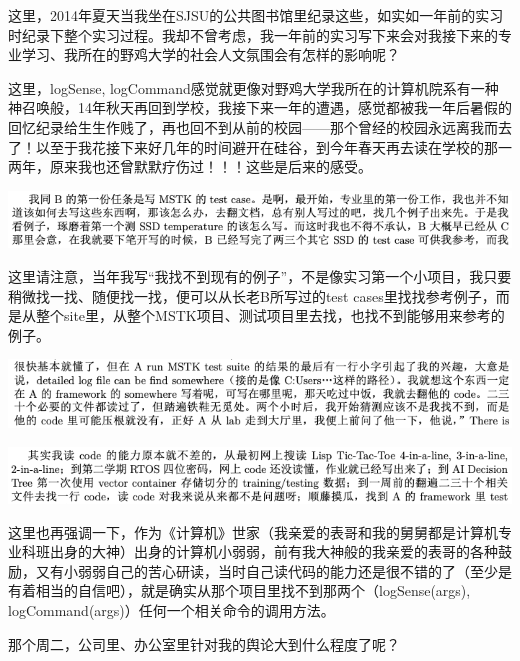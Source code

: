 \documentclass[9pt, b5paper]{article}
\begin{document}
这里，2014年夏天当我坐在SJSU的公共图书馆里纪录这些，如实如一年前的实习时纪录下整个实习过程。我却不曾考虑，我一年前的实习写下来会对我接下来的专业学习、我所在的野鸡大学的社会人文氛围会有怎样的影响呢？

这里，logSense, logCommand感觉就更像对野鸡大学我所在的计算机院系有一种神召唤般，14年秋天再回到学校，我接下来一年的遭遇，感觉都被我一年后暑假的回忆纪录给生生作贱了，再也回不到从前的校园——那个曾经的校园永远离我而去了！以至于我花接下来好几年的时间避开在硅谷，到今年春天再去读在学校的那一两年，原来我也还曾默默疗伤过！！！这些是后来的感受。

\begin{center}
\includegraphics[width=.9\linewidth]{./pic/backups_plans_20210507_114437.png}
\end{center}

这里请注意，当年我写“我找不到现有的例子”，不是像实习第一个小项目，我只要稍微找一找、随便找一找，便可以从长老B所写过的test cases里找找参考例子，而是从整个site里，从整个MSTK项目、测试项目里去找，也找不到能够用来参考的例子。 

\begin{center}
\includegraphics[width=.9\linewidth]{./pic/backups_plans_20210507_115308.png}
\end{center}

\begin{center}
\includegraphics[width=.9\linewidth]{./pic/backups_plans_20210507_115147.png}
\end{center}

这里也再强调一下，作为《计算机》世家（我亲爱的表哥和我的舅舅都是计算机专业科班出身的大神）出身的计算机小弱弱，前有我大神般的我亲爱的表哥的各种鼓励，又有小弱弱自己的苦心研读，当时自己读代码的能力还是很不错的了（至少是有着相当的自信吧），就是确实从那个项目里找不到那两个（logSense(args), logCommand(args)）任何一个相关命令的调用方法。

那个周二，公司里、办公室里针对我的舆论大到什么程度了呢？
\end{document}
